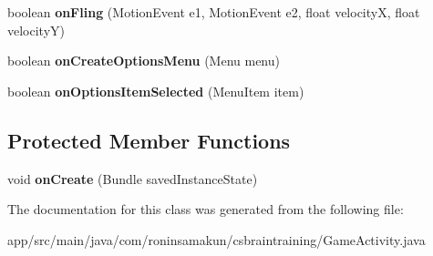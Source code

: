 \begin{DoxyCompactItemize}
\item 
boolean {\bfseries on\+Fling} (Motion\+Event e1, Motion\+Event e2, float velocity\+X, float velocity\+Y)\label{classcom_1_1roninsamakun_1_1csbraintraining_1_1_game_activity_a36cb5d9ab5a4d1b2f2b854b1ac51d316}

\item 
boolean {\bfseries on\+Create\+Options\+Menu} (Menu menu)\label{classcom_1_1roninsamakun_1_1csbraintraining_1_1_game_activity_a74c918640ad987f850e9fe514b6796e0}

\item 
boolean {\bfseries on\+Options\+Item\+Selected} (Menu\+Item item)\label{classcom_1_1roninsamakun_1_1csbraintraining_1_1_game_activity_ac55974a1a07cb93c6c31a4f321f8f3fa}

\end{DoxyCompactItemize}
\subsection*{Protected Member Functions}
\begin{DoxyCompactItemize}
\item 
void {\bfseries on\+Create} (Bundle saved\+Instance\+State)\label{classcom_1_1roninsamakun_1_1csbraintraining_1_1_game_activity_a84ccb04caeb1932adc479f9e33fe9ed8}

\end{DoxyCompactItemize}


The documentation for this class was generated from the following file\+:\begin{DoxyCompactItemize}
\item 
app/src/main/java/com/roninsamakun/csbraintraining/Game\+Activity.\+java\end{DoxyCompactItemize}
